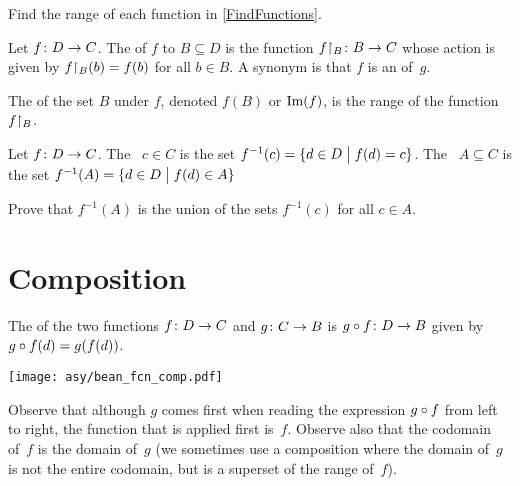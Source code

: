 \documentclass{ibl}
\begin{document}
\begin{ex}
Find the range of each function in \cref{FindFunctions}.  
\end{ex}

\begin{df}
Let $\mbox{$f\colon D\to C$}$.
The  of $f$ to $B\subseteq D$ is
the function $\mbox{${f}\mathord\upharpoonright_{B}\colon B\to C$}$ whose action is given by 
${f}\mathord\upharpoonright_{B}(b)=f(b)$ for all $b\in B$.
A synonym is that
$f$ is an  of~$g$.

The  of the set $B$ under $f$, 
denoted $f(B)$ or $\operatorname{Im}(f)$,
is the range of the function ${f}\mathord\upharpoonright_{B}$.
\end{df}

\begin{df}
Let $\mbox{$f\colon D\to C$}$.
The ~$c\in C$ is
the set $f^{-1}(c)=\{d\in D \bigm| f(d)=c\}$.
The ~$A\subseteq C$
is the set $f^{-1}(A)=\{d\in D \bigm| f(d)\in A\}$   
\end{df}

\begin{ex}
Prove that $f^{-1}(A)$ is the union of the sets $f^{-1}(c)$ for all $c\in A$.
\end{ex}





\section{Composition}

\begin{df}
The  of
the two functions
$\mbox{$f\colon D\to C$}$ and $\mbox{$g\colon C\to B$}$ 
is $\mbox{$g\mathbin{\circ} f\colon D\to B$}$ given by 
$g\mathbin{\circ} f(d)=g(f(d))$.
\end{df}

\begin{center}
  \texttt{[image: asy/bean\_fcn\_comp.pdf]}  
\end{center}
Observe that although $g$ comes first when reading the expression 
$g\mathbin{\circ} f$ 
from left to right, 
the function that is applied first is~$f$. 
Observe also that the codomain of~$f$ is the domain of~$g$
(we sometimes use a composition where the domain of~$g$ is not the 
entire codomain, but is a superset of the range of~$f$).
\end{document}
